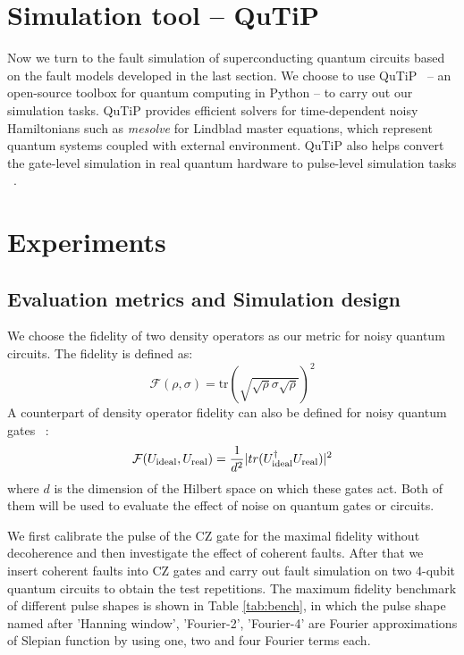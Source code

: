 \documentclass[conference, 9pt]{IEEEtran}
\begin{document}
\section{Simulation tool -- QuTiP} Now we turn to the fault simulation of superconducting quantum circuits based on the fault models developed in the last section. 
We choose to use QuTiP~\cite{JOHANSSON20131234} -- an  open-source toolbox for quantum computing in Python -- to carry out our simulation tasks. QuTiP provides efficient solvers for time-dependent noisy Hamiltonians such as \textit{mesolve} for Lindblad master equations, which represent quantum systems coupled with external environment. QuTiP also helps convert the gate-level simulation in real quantum hardware to pulse-level simulation tasks ~\cite{li2021pulselevel}. 

\section{Experiments}
\subsection{Evaluation metrics and Simulation design}
We choose the fidelity of two density operators as our metric for noisy quantum circuits. The fidelity is defined as: 
\begin{equation}
    \mathcal{F}(\rho,\sigma) = \text{tr}\left(\sqrt{\sqrt{\rho}\sigma\sqrt{\rho}}\right)^2
\end{equation}
 A counterpart of density operator fidelity  can also be defined for noisy quantum gates~\cite{Raginsky_2001} : \begin{equation}
    \mathcal{F}(U_{\rm{ideal}},U_{\rm{real}}) = \frac{1}{d^2}|tr(U_{\rm{ideal}}^{\dag}U_{\rm{real}})|^2
\end{equation} where $d$ is the dimension of the Hilbert space on which these gates act. Both of them will be used to evaluate the effect of noise on quantum gates or circuits. 

We first calibrate the pulse of the CZ gate for the maximal fidelity without decoherence and then investigate the effect of coherent faults. After that we insert coherent faults into CZ gates and carry out fault simulation on two 4-qubit quantum circuits to obtain the test repetitions. The maximum fidelity benchmark of different pulse shapes is shown in Table \ref{tab:bench}, in which the pulse shape named after 'Hanning window', 'Fourier-2', 'Fourier-4' are Fourier approximations of Slepian function by using one, two and four Fourier terms each.  
\end{document}
